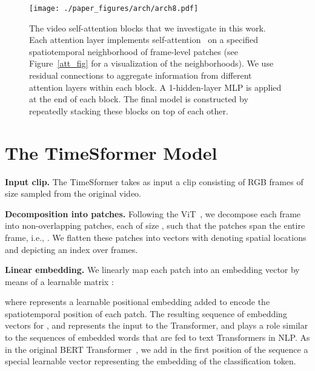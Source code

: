 \documentclass{article}
\begin{document}
\begin{figure*}
\begin{center}
   \texttt{[image: ./paper\_figures/arch/arch8.pdf]}
\end{center}
\vspace{-0.3cm}
        \caption{The video self-attention blocks that we investigate in this work. Each attention layer implements self-attention~\cite{Vaswani:2017} on a specified spatiotemporal neighborhood of frame-level patches (see Figure~\ref{att_fig} for a visualization of the neighborhoods). We use residual connections to aggregate information from different attention layers within each block. A 1-hidden-layer MLP is applied at the end of each block. The final model is constructed by repeatedly stacking these blocks on top of each other.\vspace{-0.1cm}} \label{arch_fig}
\end{figure*}


\section{The TimeSformer Model}

\textbf{Input clip.} The TimeSformer takes as input a clip  consisting of  RGB frames of size  sampled from the original video. 

\textbf{Decomposition into patches.} Following the ViT~\cite{Dosovitskiy:ICLR2021}, we decompose each frame into  non-overlapping patches, each of size , such that the  patches span the entire frame, i.e., . We flatten these patches into vectors  with  denoting spatial locations and  depicting an index over frames.




\textbf{Linear embedding.} We linearly map each patch  into an embedding vector  by means of a learnable matrix :

\vspace{-0.1cm}

\vspace{-0.1cm}

where  represents a learnable positional embedding added to encode the spatiotemporal position of each patch. The resulting sequence of embedding vectors  for , and  represents the input to the Transformer, and plays a role similar to the sequences of embedded words that are fed to text Transformers in NLP. As in the original BERT Transformer~\cite{BERT}, we add in the first position of the sequence a special learnable vector  representing the embedding of the classification token. 
\end{document}
